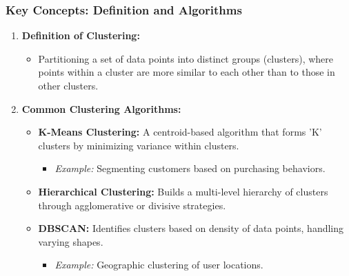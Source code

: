 \documentclass[aspectratio=169]{beamer}
\begin{document}
\begin{frame}[fragile]
    \frametitle{Key Concepts: Definition and Algorithms}
    \begin{enumerate}
        \item \textbf{Definition of Clustering:}
        \begin{itemize}
            \item Partitioning a set of data points into distinct groups (clusters), where points within a cluster are more similar to each other than to those in other clusters.
        \end{itemize}

        \item \textbf{Common Clustering Algorithms:}
        \begin{itemize}
            \item \textbf{K-Means Clustering:} A centroid-based algorithm that forms 'K' clusters by minimizing variance within clusters.
              \begin{itemize}
                  \item \textit{Example:} Segmenting customers based on purchasing behaviors.
              \end{itemize}

            \item \textbf{Hierarchical Clustering:} Builds a multi-level hierarchy of clusters through agglomerative or divisive strategies.

            \item \textbf{DBSCAN:} Identifies clusters based on density of data points, handling varying shapes.
              \begin{itemize}
                  \item \textit{Example:} Geographic clustering of user locations.
              \end{itemize}
        \end{itemize}
    \end{enumerate}
\end{frame}
\end{document}
